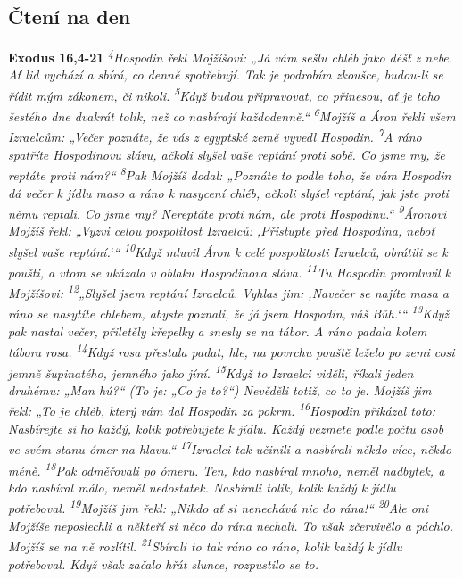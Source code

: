 \documentclass[11pt]{article}
\begin{document}
\subsection*{Čtení na den}
\textbf{Exodus 16,4-21}
\newline
\textit{
\textsuperscript{4}Hospodin řekl Mojžíšovi: „Já vám sešlu chléb jako déšť z nebe. Ať lid vychází a sbírá, co denně spotřebují. Tak je podrobím zkoušce, budou-li se řídit mým zákonem, či nikoli.
\textsuperscript{5}Když budou připravovat, co přinesou, ať je toho šestého dne dvakrát tolik, než co nasbírají každodenně.“
\textsuperscript{6}Mojžíš a Áron řekli všem Izraelcům: „Večer poznáte, že vás z egyptské země vyvedl Hospodin.
\textsuperscript{7}A ráno spatříte Hospodinovu slávu, ačkoli slyšel vaše reptání proti sobě. Co jsme my, že reptáte proti nám?“
\textsuperscript{8}Pak Mojžíš dodal: „Poznáte to podle toho, že vám Hospodin dá večer k jídlu maso a ráno k nasycení chléb, ačkoli slyšel reptání, jak jste proti němu reptali. Co jsme my? Nereptáte proti nám, ale proti Hospodinu.“
\textsuperscript{9}Áronovi Mojžíš řekl: „Vyzvi celou pospolitost Izraelců: ‚Přistupte před Hospodina, neboť slyšel vaše reptání.‘“
\textsuperscript{10}Když mluvil Áron k celé pospolitosti Izraelců, obrátili se k poušti, a vtom se ukázala v oblaku Hospodinova sláva.
\textsuperscript{11}Tu Hospodin promluvil k Mojžíšovi:
\textsuperscript{12}„Slyšel jsem reptání Izraelců. Vyhlas jim: ‚Navečer se najíte masa a ráno se nasytíte chlebem, abyste poznali, že já jsem Hospodin, váš Bůh.‘“
\textsuperscript{13}Když pak nastal večer, přiletěly křepelky a snesly se na tábor. A ráno padala kolem tábora rosa.
\textsuperscript{14}Když rosa přestala padat, hle, na povrchu pouště leželo po zemi cosi jemně šupinatého, jemného jako jíní.
\textsuperscript{15}Když to Izraelci viděli, říkali jeden druhému: „Man hú?“ (To je: „Co je to?“) Nevěděli totiž, co to je. Mojžíš jim řekl: „To je chléb, který vám dal Hospodin za pokrm.
\textsuperscript{16}Hospodin přikázal toto: Nasbírejte si ho každý, kolik potřebujete k jídlu. Každý vezmete podle počtu osob ve svém stanu ómer na hlavu.“
\textsuperscript{17}Izraelci tak učinili a nasbírali někdo více, někdo méně.
\textsuperscript{18}Pak odměřovali po ómeru. Ten, kdo nasbíral mnoho, neměl nadbytek, a kdo nasbíral málo, neměl nedostatek. Nasbírali tolik, kolik každý k jídlu potřeboval.
\textsuperscript{19}Mojžíš jim řekl: „Nikdo ať si nenechává nic do rána!“
\textsuperscript{20}Ale oni Mojžíše neposlechli a někteří si něco do rána nechali. To však zčervivělo a páchlo. Mojžíš se na ně rozlítil.
\textsuperscript{21}Sbírali to tak ráno co ráno, kolik každý k jídlu potřeboval. Když však začalo hřát slunce, rozpustilo se to.
}
\end{document}
